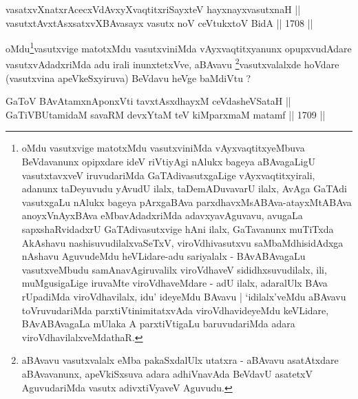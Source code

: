 
\begin{shl}
vasatxvXnatxrAcecxVdAvxyXvaqtitxriSayxteV hayxnayxvasutxnaH || \\
vasutxtAvxtAsxsatxvX\s BAvasayx vasutx noV ceVtukxtoV BidA \hfill || 1708 ||  
\end{shl}

\begin{artha}
oMdu\footnote{oMdu vasutxvige matotxMdu vasutxviniMda
vAyxvaqtitxyeMbuva BeVdavanunx opipxdare ideV riVtiyAgi nAlukx
bageya aBAvagaLigU vasutxtavxveV iruvudariMda GaTAdivasutxgaLige
vAyxvaqtitxyirali, adanunx taDeyuvudu yAvudU ilalx, taDemADuvavarU
ilalx, AvAga GaTAdi vasutxgaLu nAlukx bageya pArxgaBAva
parxdhavxMsABAva-atayxMtABAva anoyxVnAyxBAva eMbavAdadxriMda
adavxyavAguvavu, avugaLa sapxshaRvidadxrU GaTAdivasutxvige hAni
ilalx, GaTavanunx muTiTxda AkAshavu nashisuvudilalxvaSeTxV,
viroVdhivasutxvu saMbaMdhisidAdxga nAshavu AguvudeMdu heVLidare-adu
sariyalalx - BAvABAvagaLu vasutxveMbudu samAnavAgiruvalilx
viroVdhaveV sididhxsuvudilalx, ili, muMgusigaLige iruvaMte
viroVdhaveMdare - adU ilalx, adaralUlx BAva rUpadiMda
viroVdhavilalx, idu' ideyeMdu BAvavu | `idilalx'veMdu aBAvavu
toVruvudariMda parxtiVtinimitatxvAda viroVdhavideyeMdu keVLidare,
BAvABAvagaLa mUlaka A parxtiVtigaLu baruvudariMda adara
viroVdhavilalxveMdathaR.
}vasutxvige matotxMdu vasutxviniMda
vAyxvaqtitxyanunx opupxvudAdare vasutxvAdadxriMda adu irali
inunxtetxVve, aBAvavu \footnote{aBAvavu vasutxvalalx eMba
pakaSxdalUlx utatxra - aBAvavu asatAtxdare aBAvavanunx, apeVkiSxsuva
adara adhiVnavAda BeVdavU asatetxV AguvudariMda vasutx adivxtiVyaveV
Aguvudu.}vasutxvalalxde hoVdare (vasutxvina
apeVkeSxyiruva) BeVdavu heVge baMdiVtu ?
\end{artha}



\begin{shl}
GaToV BAvAtamxnA\s \s ponxVti tavxtAsxdhayxM ceVdasheVSataH ||  \\
GaTiVBUtamidaM savaRM devxYtaM teV kiMparxmaM matamf \hfill || 1709 ||  
\end{shl}

